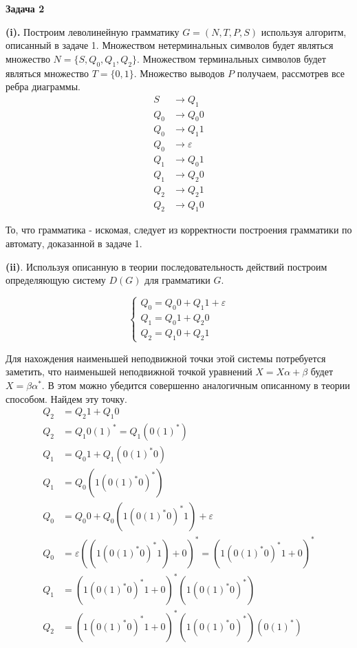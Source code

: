 \documentclass[10pt]{article}
\let \eps \varepsilon
\begin{document}
\medskip

{\bf Задача 2}

{\bf (i).}
Построим леволинейную грамматику $G = (N, T, P, S)$ используя алгоритм, описанный в задаче 1. Множеством нетерминальных символов будет являться множество $N = \{ S, Q_0, Q_1, Q_2 \}$. Множеством терминальных символов будет являться множество $T = \{ 0, 1 \}$. Множество выводов $P$ получаем, рассмотрев все ребра диаграммы.
\begin{align*}
  S &\rightarrow Q_1 \\
  Q_0 &\rightarrow Q_0 0 \\
  Q_0 &\rightarrow Q_1 1 \\
  Q_0 &\rightarrow \eps \\
  Q_1 &\rightarrow Q_0 1 \\
  Q_1 &\rightarrow Q_2 0 \\
  Q_2 &\rightarrow Q_2 1 \\
  Q_2 &\rightarrow Q_1 0
\end{align*}

То, что грамматика - искомая, следует из корректности построения грамматики по автомату, доказанной в задаче 1.

\smallskip

{\bf (ii)}.
Используя описанную в теории последовательность действий построим определяющую систему $D(G)$ для грамматики $G$.

$$
\begin{cases}
  Q_0 = Q_0 0 + Q_1 1 + \eps \\
  Q_1 = Q_0 1 + Q_2 0 \\
  Q_2 = Q_1 0 + Q_2 1
\end{cases}
$$

Для нахождения наименьшей неподвижной точки этой системы потребуется заметить, что наименьшей неподвижной точкой уравнений $X = X \alpha + \beta$ будет $X = \beta \alpha^*$. В этом можно убедится совершенно аналогичным описанному в теории способом. Найдем эту точку.
\begin{align*}
  Q_2 &= Q_2 1 + Q_1 0 \\
  Q_2 &= Q_1 0 (1)^* = Q_1 (0 (1)^*) \\
  Q_1 &= Q_0 1 + Q_1 (0 (1)^* 0) \\
  Q_1 &= Q_0 (1 (0 (1)^* 0)^*) \\
  Q_0 &= Q_0 0 + Q_0 (1 (0 (1)^* 0)^* 1) + \eps \\
  Q_0 &= \eps ((1(0 (1)^* 0)^* 1) + 0)^* = (1(0 (1)^* 0)^* 1 + 0)^* \\
  Q_1 &= (1(0 (1)^* 0)^* 1 + 0)^* (1 (0 (1)^* 0)^* ) \\
  Q_2 &= (1(0 (1)^* 0)^* 1 + 0)^* (1 (0 (1)^* 0)^* ) (0 (1)^*)
\end{align*}
\end{document}
